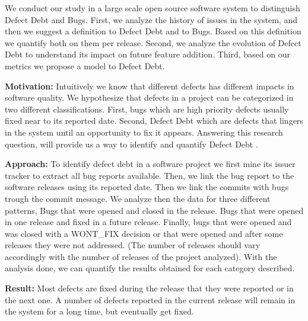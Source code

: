 We conduct our study in a large scale open source software system to distinguish Defect Debt and Bugs. First, we analyze the history of issues in the system, and then we suggest a definition to Defect Debt and to Bugs. Based on this definition we quantify  both on them per release. Second, we analyze the evolution of Defect Debt to understand its impact on future feature addition. Third, based on our metrics we propose a model to Defect Debt.

\vspace{3mm}
\noindent\rqi
\vspace{3mm}

\noindent\textbf{Motivation:} Intuitively we know that different defects has different impacts in software quality. We hypothesize that defects in a project can be categorized in two different classifications. First, bugs which are high priority defects usually fixed near to its reported date. Second, Defect Debt which are defects that lingers in the system until an opportunity to fix it appears. Answering this research question, will provide us a way to identify and quantify Defect Debt .

\vspace{1mm}
\noindent\textbf{Approach:} To identify defect debt in a software project we first mine its issuer tracker to extract all bug reports available. Then, we link the bug report to the software releases using its reported date. Then we link the commits with bugs trough the commit message.  We analyze then the data for three different patterns, Bugs that were opened and closed in the release. Bugs that were opened in one release and fixed in a future release. Finally, bugs that were opened and was closed with a WONT\_FIX decision or that were opened and after some releases they were not addressed. (The number of releases should vary accordingly with the number of releases of the project analyzed). With the analysis done, we can quantify the results obtained for each category described.

\vspace{1mm}
\noindent\textbf{Result:} Most defects are fixed during the release that they were reported or in the next one. A number of defects reported in the current release will remain in the system for a long time, but eventually get fixed.


